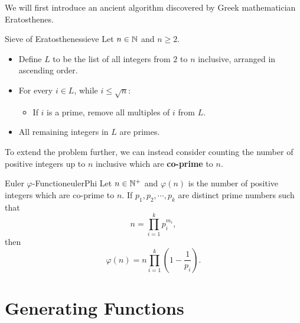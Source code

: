 \documentclass[math]{amznotes}
\theoremstyle{remark}
\begin{document}
We will first introduce an ancient algorithm discovered by Greek mathematician Eratosthenes.
\begin{tecbox}{Sieve of Eratosthenes}{sieve}
    Let $n \in \mathbb{N}$ and $n \geq 2$.
    \begin{itemize}
        \item Define $L$ to be the list of all integers from $2$ to $n$ inclusive, arranged in ascending order.
        \item For every $i \in L$, while $i \leq \sqrt{n}$:
        \begin{itemize}
            \item If $i$ is a prime, remove all multiples of $i$ from $L$.
        \end{itemize}
        \item All remaining integers in $L$ are primes.
    \end{itemize}
\end{tecbox}
To extend the problem further, we can instead consider counting the number of positive integers up to $n$ inclusive which are \textbf{co-prime} to $n$.
\begin{thmbox}{Euler $\varphi$-Function}{eulerPhi}
    Let $n \in \mathbb{N}^+$ and $\varphi(n)$ is the number of positive integers which are co-prime to $n$. If $p_1, p_2, \cdots, p_k$ are distinct prime numbers such that
    \begin{equation*}
        n = \prod_{i = 1}^{k}p_i^{m_i},
    \end{equation*} 
    then
    \begin{equation*}
        \varphi(n) = n\prod_{i = 1}^{k}\left(1 - \frac{1}{p_i}\right).
    \end{equation*}
\end{thmbox}

\chapter{Generating Functions}
\end{document}
